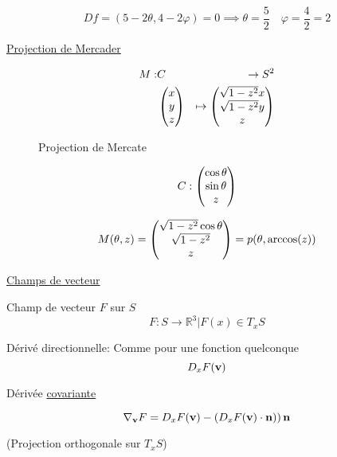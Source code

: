 $$Df = (5-2\theta, 4-2\varphi) = 0 \implies \theta= \frac{5}{2} \quad \varphi= \frac{4}{2} = 2$$ 

\underline{Projection de Mercader} 

$$\begin{aligned}
	M: &C &\to S^2\\
	   &\begin{pmatrix} x\\y\\z \end{pmatrix} &\mapsto \begin{pmatrix} \sqrt{1-z^2}x \\ \sqrt{1-z^2} y \\z \end{pmatrix}
\end{aligned}$$ 

\begin{figure}[ht]
    \centering
    \caption{Projection de Mercate}
    \label{fig:projection-de-mercate}
\end{figure}

$$C: \begin{pmatrix} \cos\theta\\\sin\theta\\z \end{pmatrix}$$ 

$$M (\theta, z) = \begin{pmatrix} \sqrt{1-z^2}\cos\theta\\\sqrt{1-z^2} \\ z \end{pmatrix} = p(\theta, \arccos(z))$$ 

\underline{Champs de vecteur} 

Champ de vecteur $F$ sur $S$  
$$F: S \to \mathbb{R}^{3} | F(x) \in T_x S$$ 

Dérivé directionnelle: Comme pour une fonction quelconque $$D_x F(\vb{v})$$ 


Dérivée \underline{covariante} 

$$\nabla_{\vb{v}} F = D_x F(\vb{v}) - \left( D_x F(\vb{v}) \cdot \vb{n})  \right)\vb{n} $$ 

(Projection orthogonale sur $T_x S$) 



